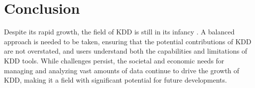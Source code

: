 \section{Conclusion}

Despite its rapid growth, the field of KDD is still in its infancy \cite{Fayyad:1996}. A balanced approach is needed to be taken, ensuring that the potential contributions of KDD are not overstated, and users understand both the capabilities and limitations of KDD tools. While challenges persist, the societal and economic needs for managing and analyzing vast amounts of data continue to drive the growth of KDD, making it a field with significant potential for future developments.

